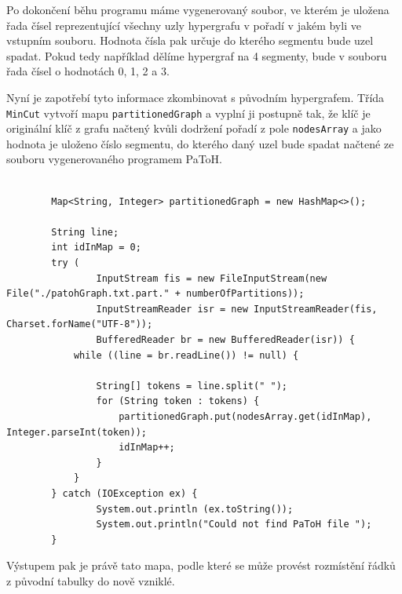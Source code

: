 \documentclass[thesis=M,czech]{FITthesis}[2012/06/26]
\begin{document}
Po dokončení běhu programu máme vygenerovaný soubor, ve kterém je uložena řada čísel reprezentující všechny uzly hypergrafu v pořadí v jakém byli ve vstupním souboru. Hodnota čísla pak určuje do kterého segmentu bude uzel spadat. Pokud tedy například dělíme hypergraf na 4 segmenty, bude v souboru řada čísel o hodnotách 0, 1, 2 a 3. 

Nyní je zapotřebí tyto informace zkombinovat s původním hypergrafem. Třída \texttt{MinCut} vytvoří mapu \texttt{partitionedGraph} a vyplní ji postupně tak, že klíč je originální klíč z grafu načtený kvůli dodržení pořadí z pole \texttt{nodesArray} a jako hodnota je uloženo číslo segmentu, do kterého daný uzel bude spadat načtené ze souboru vygenerovaného programem PaToH.
\begin{lstlisting}[frame=single]  % Start your code-block

        Map<String, Integer> partitionedGraph = new HashMap<>();

        String line;
        int idInMap = 0;
        try (
                InputStream fis = new FileInputStream(new File("./patohGraph.txt.part." + numberOfPartitions));
                InputStreamReader isr = new InputStreamReader(fis, Charset.forName("UTF-8"));
                BufferedReader br = new BufferedReader(isr)) {
            while ((line = br.readLine()) != null) {

                String[] tokens = line.split(" ");
                for (String token : tokens) {
                    partitionedGraph.put(nodesArray.get(idInMap), Integer.parseInt(token));
                    idInMap++;
                }
            }
        } catch (IOException ex) {
                System.out.println (ex.toString());
                System.out.println("Could not find PaToH file ");
        }
\end{lstlisting}

Výstupem  pak je právě tato mapa, podle které se může provést rozmístění řádků z původní tabulky do nově vzniklé.
\end{document}
